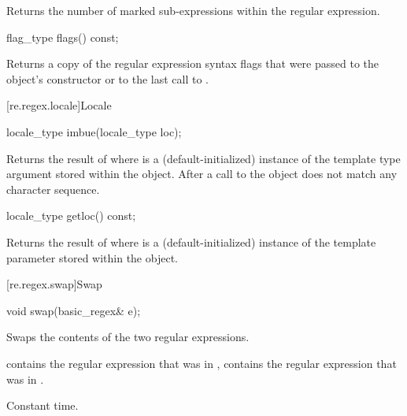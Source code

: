\begin{itemdescr}
\pnum
\effects  Returns the number of marked sub-expressions within the
regular expression.
\end{itemdescr}

%
\begin{itemdecl}
flag_type flags() const;
\end{itemdecl}

\begin{itemdescr}
\pnum
\effects  Returns a copy of the regular expression syntax flags that
were passed to the object's constructor or to the last call
to .
\end{itemdescr}

[re.regex.locale]{Locale}%

%
\begin{itemdecl}
locale_type imbue(locale_type loc);
\end{itemdecl}

\begin{itemdescr}
\pnum\effects  Returns the result of  where
 is a (default-initialized) instance of the template
type argument  stored within the object.  After a call
to  the  object does not match any
character sequence.
\end{itemdescr}

%
\begin{itemdecl}
locale_type getloc() const;
\end{itemdecl}

\begin{itemdescr}
\pnum\effects  Returns the result of  where
 is a (default-initialized) instance of the template
parameter  stored within the object.
\end{itemdescr}

[re.regex.swap]{Swap}
%

%
\begin{itemdecl}
void swap(basic_regex& e);
\end{itemdecl}

\begin{itemdescr}
\pnum\effects  Swaps the contents of the two regular expressions.

\pnum\ensures  {} contains the regular expression
that was in ,  contains the regular expression that
was in .

\pnum\complexity Constant time.
\end{itemdescr}

